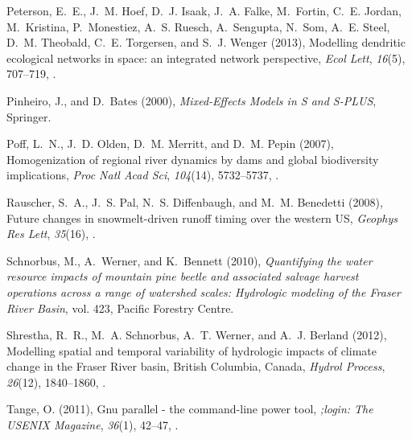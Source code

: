\documentclass[draft,linenumbers]{AGUJournal}
\begin{document}
\begin{thebibliography}{38}
Peterson, E.~E., J.~M. Hoef, D.~J. Isaak, J.~A. Falke, M.~Fortin, C.~E. Jordan,
  M.~Kristina, P.~Monestiez, A.~S. Ruesch, A.~Sengupta, N.~Som, A.~E. Steel,
  D.~M. Theobald, C.~E. Torgersen, and S.~J. Wenger (2013), Modelling dendritic
  ecological networks in space: an integrated network perspective, \textit{Ecol
  Lett}, \textit{16}(5), 707--719, .

Pinheiro, J., and D.~Bates (2000), \textit{{Mixed-Effects} Models in S and
  {S-PLUS}}, Springer.

Poff, L.~N., J.~D. Olden, D.~M. Merritt, and D.~M. Pepin (2007), Homogenization
  of regional river dynamics by dams and global biodiversity implications,
  \textit{Proc Natl Acad Sci}, \textit{104}(14), 5732--5737,
  .

Rauscher, S.~A., J.~S. Pal, N.~S. Diffenbaugh, and M.~M. Benedetti (2008),
  Future changes in snowmelt{-}driven runoff timing over the western {US},
  \textit{Geophys Res Lett}, \textit{35}(16), .

Schnorbus, M., A.~Werner, and K.~Bennett (2010), \textit{Quantifying the water
  resource impacts of mountain pine beetle and associated salvage harvest
  operations across a range of watershed scales: Hydrologic modeling of the
  {F}raser {R}iver Basin}, vol. 423, Pacific Forestry Centre.

Shrestha, R.~R., M.~A. Schnorbus, A.~T. Werner, and A.~J. Berland (2012),
  Modelling spatial and temporal variability of hydrologic impacts of climate
  change in the {F}raser {R}iver basin, {B}ritish {C}olumbia, {C}anada, \textit{Hydrol
  Process}, \textit{26}(12), 1840--1860, .

Tange, O. (2011), Gnu parallel - the command-line power tool, \textit{;login:
  The USENIX Magazine}, \textit{36}(1), 42--47,
  .


\end{thebibliography}
\end{document}
